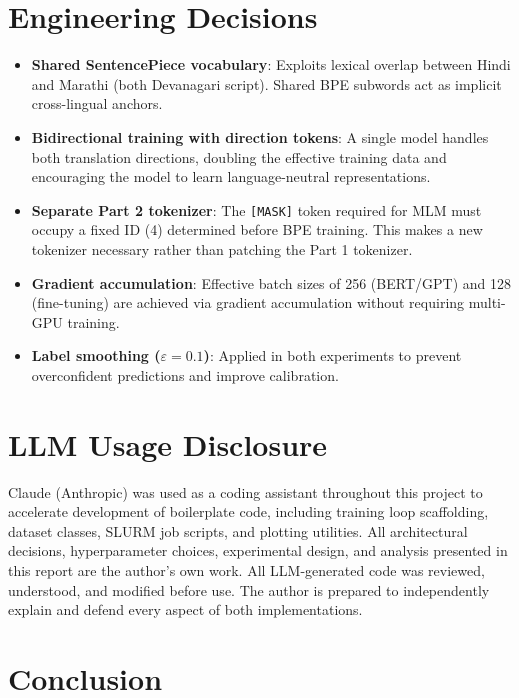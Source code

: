 \documentclass[12pt,a4paper]{article}
\begin{document}
\section{Engineering Decisions}

\begin{itemize}
    \item \textbf{Shared SentencePiece vocabulary}: Exploits lexical overlap between Hindi and Marathi (both Devanagari script). Shared BPE subwords act as implicit cross-lingual anchors.
    \item \textbf{Bidirectional training with direction tokens}: A single model handles both translation directions, doubling the effective training data and encouraging the model to learn language-neutral representations.
    \item \textbf{Separate Part 2 tokenizer}: The \texttt{[MASK]} token required for MLM must occupy a fixed ID (4) determined before BPE training. This makes a new tokenizer necessary rather than patching the Part 1 tokenizer.
    \item \textbf{Gradient accumulation}: Effective batch sizes of 256 (BERT/GPT) and 128 (fine-tuning) are achieved via gradient accumulation without requiring multi-GPU training.
    \item \textbf{Label smoothing ($\varepsilon=0.1$)}: Applied in both experiments to prevent overconfident predictions and improve calibration.
\end{itemize}

\section{LLM Usage Disclosure}

Claude (Anthropic) was used as a coding assistant throughout this project to accelerate development of boilerplate code, including training loop scaffolding, dataset classes, SLURM job scripts, and plotting utilities. All architectural decisions, hyperparameter choices, experimental design, and analysis presented in this report are the author's own work. All LLM-generated code was reviewed, understood, and modified before use. The author is prepared to independently explain and defend every aspect of both implementations.

\section{Conclusion}
\end{document}

